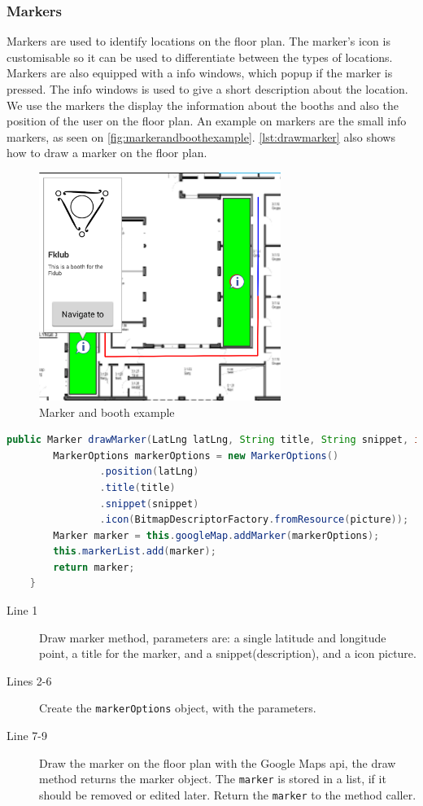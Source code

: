 \subsubsection*{Markers}
Markers are used to identify locations on the floor plan. The marker's icon is customisable so it can be used to differentiate between the types of locations. Markers are also equipped with a info windows, which popup if the marker is pressed. The info windows is used to give a short description about the location. We use the markers the display the information about the booths and also the position of the user on the floor plan. An example on markers are the small info markers, as seen on \autoref{fig:markerandboothexample}. \autoref{lst:drawmarker} also shows how to draw a marker on the floor plan.
\begin{figure}[H]
\centering
\includegraphics[width=0.7\textwidth]{img/markerandbooth.png}
\caption{Marker and booth example}
\label{fig:markerandboothexample}
\end{figure}
\begin{lstlisting}[language=java, label=lst:drawmarker, caption=Method for drawing a marker.]
    public Marker drawMarker(LatLng latLng, String title, String snippet, int picture){
        MarkerOptions markerOptions = new MarkerOptions()
                .position(latLng)
                .title(title)
                .snippet(snippet)
                .icon(BitmapDescriptorFactory.fromResource(picture));
        Marker marker = this.googleMap.addMarker(markerOptions);
        this.markerList.add(marker);
        return marker;
    }
\end{lstlisting}
\begin{description}
\item[Line 1] Draw marker method, parameters are: a single latitude and longitude point, a title for the marker, and a snippet(description), and a icon picture. 
\item[Lines 2-6] Create the \lstinline|markerOptions| object, with the parameters.
\item[Line 7-9] Draw the marker on the floor plan with the Google Maps \ac{api}, the draw method returns the marker object. The \lstinline|marker| is stored in a list, if it should be removed or edited later. Return the \lstinline|marker| to the method caller.
\end{description}

